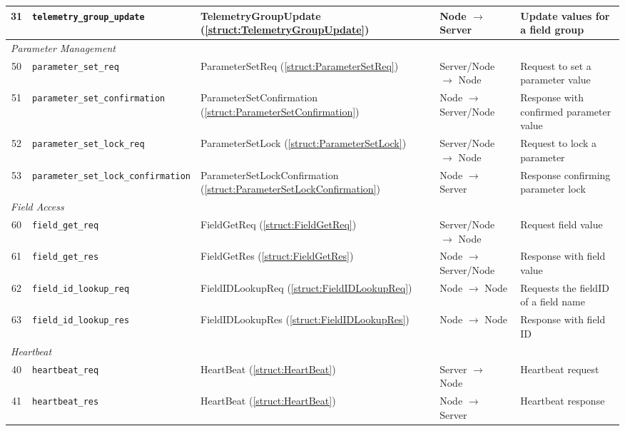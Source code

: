 \begin{landscape}
\begin{center}
\begin{longtable}{c l l l  p{6cm}}
31 & \texttt{telemetry\_group\_update}\label{msg:parameter-group-update} & TelemetryGroupUpdate (\ref{struct:TelemetryGroupUpdate}) & Node $\rightarrow$ Server & Update values for a field group \\
\midrule
\multicolumn{5}{l}{\textit{Parameter Management}} \\
50 & \texttt{parameter\_set\_req}\label{msg:parameter-set-req} & ParameterSetReq (\ref{struct:ParameterSetReq}) & Server/Node $\rightarrow$ Node & Request to set a parameter value \\
51 & \texttt{parameter\_set\_confirmation}\label{msg:parameter-set-confirmation} & ParameterSetConfirmation (\ref{struct:ParameterSetConfirmation}) & Node $\rightarrow$ Server/Node & Response with confirmed parameter value \\
52 & \texttt{parameter\_set\_lock\_req}\label{msg:parameter-set-lock-req} & ParameterSetLock (\ref{struct:ParameterSetLock}) & Server/Node $\rightarrow$ Node & Request to lock a parameter \\
53 & \texttt{parameter\_set\_lock\_confirmation}\label{msg:parameter-set-lock-res} & ParameterSetLockConfirmation (\ref{struct:ParameterSetLockConfirmation}) & Node $\rightarrow$ Server & Response confirming parameter lock \\
\midrule
\multicolumn{5}{l}{\textit{Field Access}} \\
60 & \texttt{field\_get\_req}\label{msg:field-get-req} & FieldGetReq (\ref{struct:FieldGetReq}) & Server/Node $\rightarrow$ Node & Request field value \\
61 & \texttt{field\_get\_res}\label{msg:field-get-res} & FieldGetRes (\ref{struct:FieldGetRes}) & Node $\rightarrow$ Server/Node & Response with field value \\
62 & \texttt{field\_id\_lookup\_req}\label{msg:field-id-lookup-req} & FieldIDLookupReq (\ref{struct:FieldIDLookupReq}) & Node $\rightarrow$ Node & Requests the fieldID of a field name \\
63 & \texttt{field\_id\_lookup\_res}\label{msg:field-id-lookup-res} & FieldIDLookupRes (\ref{struct:FieldIDLookupRes}) & Node $\rightarrow$ Node & Response with field ID \\
\midrule
\multicolumn{5}{l}{\textit{Heartbeat}} \\
40 & \texttt{heartbeat\_req}\label{msg:heartbeat-req} & HeartBeat (\ref{struct:HeartBeat}) & Server $\rightarrow$ Node & Heartbeat request \\
41 & \texttt{heartbeat\_res}\label{msg:heartbeat-res} & HeartBeat (\ref{struct:HeartBeat}) & Node $\rightarrow$ Server & Heartbeat response \\
\midrule
\bottomrule
\end{longtable}
\end{center}
\end{landscape}
